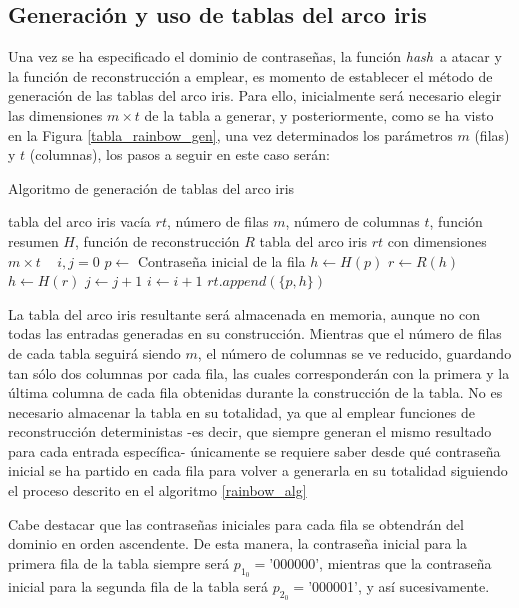 \documentclass[12pt,spanish,listoffigures,listoftables,listofalgorithms]{tfgetsinf}
\newcommand{\hash}{\textit{hash}}
\begin{document}
\subsection{Generación y uso de tablas del arco iris}

Una vez se ha especificado el dominio de contraseñas, la función \hash~a atacar y la función de reconstrucción a emplear, es momento de establecer el método de generación de las tablas del arco iris. Para ello, inicialmente será necesario elegir las dimensiones $m \times t$ de la tabla a generar, y posteriormente, como se ha visto en la Figura \ref{tabla_rainbow_gen}, una vez determinados los parámetros $m$ (filas) y $t$ (columnas), los pasos a seguir en este caso serán:

\begin{algorithm}[H]
	\caption{Algoritmo de generación de tablas del arco iris}
	\label{rainbow_alg}
	\begin{algorithmic}
		\REQUIRE tabla del arco iris vacía $rt$, número de filas $m$, número de columnas $t$, función resumen $H$, función de reconstrucción $R$
		\ENSURE tabla del arco iris $rt$ con dimensiones $m \times t$
		\STATE ~
		\STATE $i, j = 0$
			\STATE $p \leftarrow$ Contraseña inicial de la fila
			\STATE $h \leftarrow H(p)$
				\STATE $r \leftarrow R(h)$
				\STATE $h \leftarrow H(r)$
				\STATE $j \leftarrow j + 1$
			\ENDWHILE
			\STATE $i \leftarrow i + 1$
			\STATE $rt.append(\{p, h\})$
		\ENDWHILE
	\end{algorithmic}
\end{algorithm}

La tabla del arco iris resultante será almacenada en memoria, aunque no con todas las entradas generadas en su construcción. Mientras que el número de filas de cada tabla seguirá siendo $m$, el número de columnas se ve reducido, guardando tan sólo dos columnas por cada fila, las cuales corresponderán con la primera y la última columna de cada fila obtenidas durante la construcción de la tabla. No es necesario almacenar la tabla en su totalidad, ya que al emplear funciones de reconstrucción deterministas -es decir, que siempre generan el mismo resultado para cada entrada específica- únicamente se requiere saber desde qué contraseña inicial se ha partido en cada fila para volver a generarla en su totalidad siguiendo el proceso descrito en el algoritmo \ref{rainbow_alg}

Cabe destacar que las contraseñas iniciales para cada fila se obtendrán del dominio en orden ascendente. De esta manera, la contraseña inicial para la primera fila de la tabla siempre será $p_{1_0} = $'000000', mientras que la contraseña inicial para la segunda fila de la tabla será $p_{2_0} = $'000001', y así sucesivamente.
\end{document}
